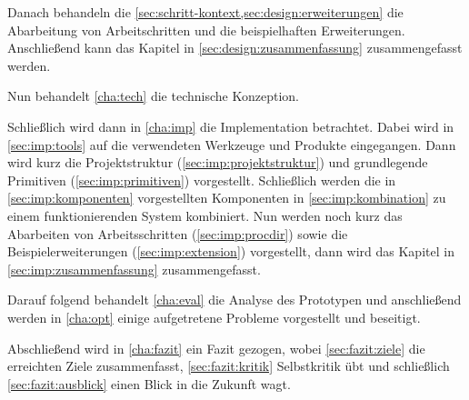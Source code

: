 Danach behandeln die \cref{sec:schritt-kontext,sec:design:erweiterungen} die Abarbeitung von Arbeitschritten und die beispielhaften Erweiterungen.
Anschließend kann das Kapitel in \cref{sec:design:zusammenfassung} zusammengefasst werden.

Nun behandelt \cref{cha:tech} die technische Konzeption.


Schließlich wird dann in \cref{cha:imp} die Implementation betrachtet.
Dabei wird in \cref{sec:imp:tools} auf die verwendeten Werkzeuge und Produkte eingegangen. Dann wird kurz die Projektstruktur (\cref{sec:imp:projektstruktur}) und grundlegende Primitiven (\cref{sec:imp:primitiven}) vorgestellt.
Schließlich werden die in \cref{sec:imp:komponenten} vorgestellten Komponenten in \cref{sec:imp:kombination} zu einem funktionierenden System kombiniert.
Nun werden noch kurz das Abarbeiten von Arbeitsschritten (\cref{sec:imp:procdir}) sowie die Beispielerweiterungen (\cref{sec:imp:extension}) vorgestellt,
dann wird das Kapitel in \cref{sec:imp:zusammenfassung} zusammengefasst.

Darauf folgend behandelt \cref{cha:eval} die Analyse des Prototypen und anschließend werden in \cref{cha:opt} einige aufgetretene Probleme vorgestellt und beseitigt.

Abschließend wird in \cref{cha:fazit} ein Fazit gezogen,
wobei \cref{sec:fazit:ziele} die erreichten Ziele zusammenfasst,
\cref{sec:fazit:kritik} Selbstkritik übt und schließlich \cref{sec:fazit:ausblick} einen Blick in die Zukunft wagt.

